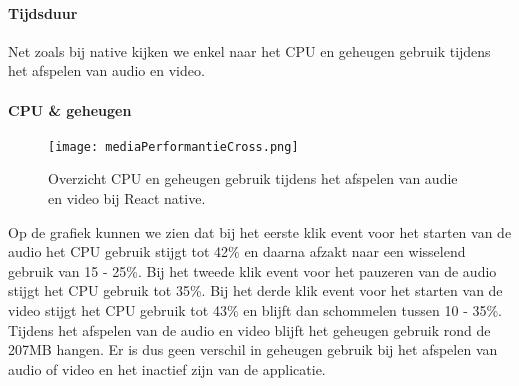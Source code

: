 \paragraph{Tijdsduur}
Net zoals bij native kijken we enkel naar het CPU en geheugen gebruik tijdens 
het afspelen van audio en video.

\paragraph{CPU \& geheugen}
\begin{figure}[H]
    \centering
    \texttt{[image: mediaPerformantieCross.png]}
    \caption{Overzicht CPU en geheugen gebruik tijdens het afspelen van audie en video bij React native.}
\end{figure}
Op de grafiek kunnen we zien dat bij het eerste klik event voor het starten van de audio het 
CPU gebruik stijgt tot 42\% en daarna afzakt naar een wisselend gebruik van 15 - 25\%. Bij het
tweede klik event voor het pauzeren van de audio stijgt het CPU gebruik tot 35\%. 
Bij het derde klik event voor het starten van de video stijgt het CPU gebruik tot 43\% en 
blijft dan schommelen tussen 10 - 35\%. Tijdens het afspelen van de audio en video blijft 
het geheugen gebruik rond de 207MB hangen. Er is dus geen verschil in
geheugen gebruik bij het afspelen van audio of video en het inactief zijn van de applicatie.
